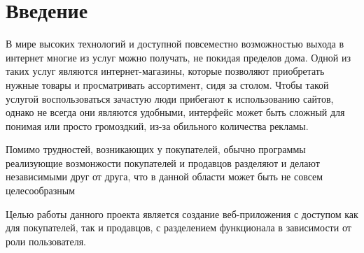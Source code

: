 \chapter*{Введение}
В мире высоких технологий и доступной повсеместно возможностью выхода в интернет многие из услуг можно получать, не покидая пределов дома. Одной из таких услуг являются интернет-магазины, которые позволяют приобретать нужные товары и просматривать ассортимент, сидя за столом. Чтобы такой услугой воспользоваться зачастую люди прибегают к использованию сайтов, однако не всегда они являются удобными, интерфейс может быть сложный для понимая или просто громоздкий, из-за обильного количества рекламы.

\hspace{0cm} Помимо трудностей, возникающих у покупателей, обычно программы реализующие возмонжости покупателей и продавцов разделяют и делают независимыми друг от друга, что в данной области может быть не совсем целесообразным

\hspace{0cm} Целью работы данного проекта является создание веб-приложения с доступом как для покупателей, так и продавцов, с разделением функционала в зависимости от роли пользователя.